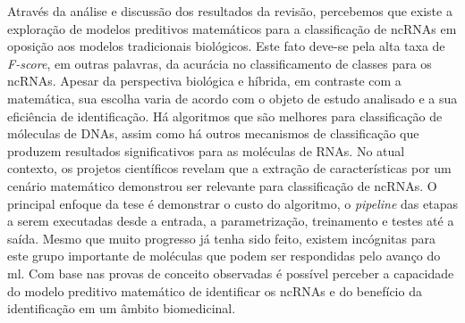 Através da análise e discussão dos resultados da revisão, percebemos que existe
a exploração de modelos preditivos matemáticos para a classificação de ncRNAs em oposição aos modelos tradicionais biológicos. Este fato deve-se pela alta taxa de \textit{F-score}, em outras palavras, da acurácia no classificamento de classes para os ncRNAs. Apesar da perspectiva biológica e híbrida, em contraste com a matemática, sua escolha varia de acordo com o objeto de estudo analisado e a sua eficiência de identificação. Há algoritmos que são melhores para classificação de móleculas de DNAs, assim como há outros mecanismos de classificação que produzem resultados significativos para as moléculas de RNAs. No atual contexto, os projetos científicos revelam que a extração de características por um cenário matemático demonstrou ser relevante para classificação de ncRNAs. O principal enfoque da tese é demonstrar o custo do algoritmo, o \textit{pipeline} das etapas a serem executadas desde a entrada, a parametrização, treinamento e testes até a saída. Mesmo que muito progresso já tenha sido feito, existem incógnitas para este grupo importante de moléculas que podem ser respondidas pelo avanço do \ac{ml}. Com base nas provas de conceito observadas é possível perceber a capacidade do modelo preditivo matemático de identificar os ncRNAs e do benefício da identificação em um âmbito biomedicinal.












